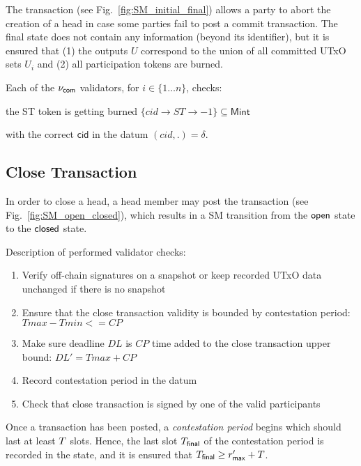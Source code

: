 The \mtxAbort{} transaction
(see Fig.~\ref{fig:SM_initial_final}) allows a party to abort the
creation of a head in case some parties fail to post a commit
transaction.  The final state does not contain any information (beyond
its identifier), but it is ensured that (1) the outputs $U$ correspond
to the union of all committed UTxO sets $U_i$ and (2) all
participation tokens are burned.

Each of the $\nu_\mathsf{com}$ validators, for $i \in \{ 1\dots n\}$, checks:

\begin{menumerate}
  \item the ST token is getting burned $\{cid \rightarrow ST \rightarrow -1\} \subseteq \mathsf{Mint}$
  \item with the correct $\mathsf{cid}$ in the datum $(cid,.) = \delta$.
\end{menumerate}





\subsection{Close Transaction} 

In order to close a head, a head
member may post the \mtxClose{} transaction (see
Fig.~\ref{fig:SM_open_closed}), which results in a SM transition
from the $\mathsf{open}$ state to the $\mathsf{closed}$ state.\newline

Description of performed validator checks:

\begin{enumerate}
  \item Verify off-chain signatures on a snapshot or keep recorded UTxO data unchanged if there is no snapshot 
  \item Ensure that the close transaction validity is bounded by contestation period: $Tmax - Tmin <= CP$  
  \item Make sure deadline $DL$ is $CP$ time added to the close transaction upper bound: $DL' = Tmax + CP$
  \item Record contestation period in the datum 
  \item Check that close transaction is signed by one of the valid participants
\end{enumerate}

Once a \mtxClose{} transaction has been posted, a \emph{contestation period}
begins which should last at least $T$ slots.  Hence, the last slot
$T_{\mathsf{final}}$ of the contestation period is recorded in the state, and it
is ensured that $T_{\mathsf{final}} \geq r_{\mathsf{max}}' + T$.

